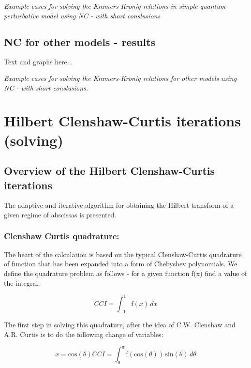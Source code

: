 \documentclass[12pt,twoside,a4paper]{article}
\def\emptyline{\vspace{12pt}}
\numberwithin{equation}{subsection}
\numberwithin{figure}{subsection}
\begin{document}
\emptyline

\textit{Example cases for solving the Kramers-Kronig relations in simple quantum-perturbative model using NC - with short
conslusions}

\subsection{NC for other models - results} \label{chap:nc_other}

Text and graphs here... 

\textit{Example cases for solving the Kramers-Kronig relations for other models using NC - with short conslusions.}

\section{Hilbert Clenshaw-Curtis iterations (solving)} \label{chap:hcc}

\subsection{Overview of the Hilbert Clenshaw-Curtis iterations} \label{chap:hcc_overview}

The adaptive and iterative algorithm for obtaining the Hilbert transform of a given regime of abscissas is presented. 

\subsubsection*{Clenshaw Curtis quadrature: }

The heart of the calculation is based on the typical Clenshaw-Curtis quadrature of function that has been expanded into a form of
Chebyshev polynomials. We define the quadrature problem as follows - for a given function f(x) find a value of the integral:

\begin{equation} \label{eq:cci_equation}
  CCI = \int_{ - 1}^{1}\mathrm{f}(x)\,dx
\end{equation}

The first step in solving this quadrature, after the idea of C.W. Clenshaw and A.R. Curtis \cite{clenshaw_method} is to do the
following change of variables:

\begin{subequations} \label{eq:cci_variables}
  \begin{equation} \label{eq:ccivars_x}
    x=\mathrm{cos}(\theta ) 
  \end{equation}
  \begin{equation} \label{eq:ccivars_cci}
    CCI = \int_{0}^{\pi }\mathrm{f}(\mathrm{cos}(\theta ))\,\mathrm{sin}( \theta )\,d\theta  
  \end{equation}
\end{subequations} 
 
\end{document}
